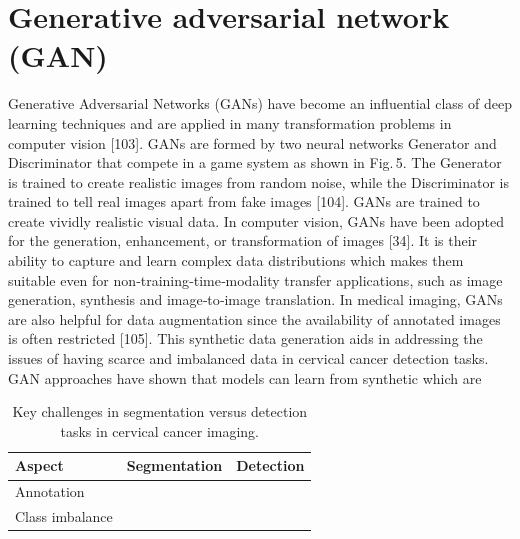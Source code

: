 \documentclass{svjour3}
\begin{document}
\section{Generative adversarial network (GAN)}
Generative Adversarial Networks (GANs) have become an influential class of deep learning techniques and are applied in many transformation problems in computer vision [103]. GANs are formed by two neural networks Generator and Discriminator that compete in a game system as shown in Fig. 5. The Generator is trained to create realistic images from random noise, while the Discriminator is trained to tell real images apart from fake images [104]. GANs are trained to create vividly realistic visual data. In computer vision, GANs have been adopted for the generation, enhancement, or transformation of images [34]. It is their ability to capture and learn complex data distributions which makes them suitable even for non‑training‑time‑modality transfer applications, such as image generation, synthesis and image‑to‑image translation. In medical imaging, GANs are also helpful for data augmentation since the availability of annotated images is often restricted [105].
This synthetic data generation aids in addressing the issues of having scarce and imbalanced data in cervical cancer detection tasks. GAN approaches have shown that models can learn from synthetic which are
\begin{table}[htbp]
\centering
\caption{Key challenges in segmentation versus detection tasks in cervical cancer imaging.}
\label{tab:challenges}
\begin{tabular}{lll}
\hline
Aspect & Segmentation & Detection \\
\hline
Annotation & & \\
Class imbalance & & \\
\hline
\end{tabular}
\end{table}
\end{document}

